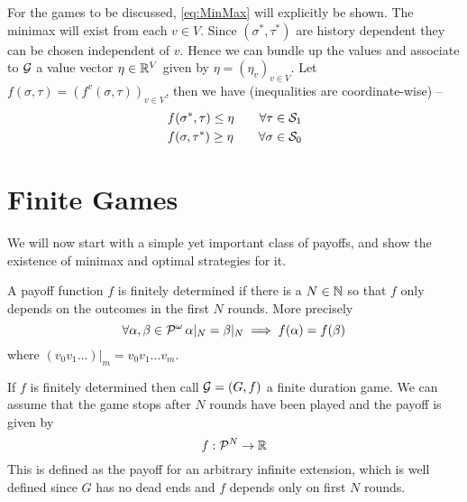 For the games to be discussed, \eqref{eq:MinMax} will explicitly be shown. The minimax will exist from each $v \in V$.  Since $(\sigma^*,\tau^*)$ are history dependent they can be chosen independent of $v$. Hence we can bundle up the values and associate to $\G$ a value vector $\eta \in \Reals^V$ given by $\eta = (\eta_v)_{v\in V}$. Let $f(\sigma,\tau) = (f^v(\sigma,\tau))_{v \in V}$, then we have (inequalities are coordinate-wise) --
\begin{equation}
    \begin{aligned}
    f(\sigma^*, \tau) \leq \eta \qquad \forall \tau \in \ST{1}\\
    f(\sigma,\tau^*) \geq \eta \qquad \forall \sigma \in \ST{0}
    \end{aligned}\label{eq:vecMinMax}
\end{equation}

\section{Finite Games}
\label{sec:finitegames}

We will now start with a simple yet important class of payoffs, and show the existence of minimax and optimal strategies for it. 

A payoff function $f$ is finitely determined if there is a $N \in \Nat$ so that $f$ only depends on the outcomes in the first $N$ rounds. More precisely 
\[
    \forall \alpha,\beta \in \PI\, \alpha|_N=\beta|_N \implies f(\alpha) = f(\beta) 
\]
where $( v_0 v_1 \ldots )|_m = v_0v_1 \ldots v_m$.

If $f$ is finitely determined then call $\G=(G,f)$ a finite duration game. We can assume that the game stops after $N$ rounds have been played and the payoff is given by 
\[
    f : \PF[N] \to \Reals
\]
This is defined as the payoff for an arbitrary infinite extension, which is well defined since $G$ has no dead ends and $f$ depends only on first $N$ rounds.

